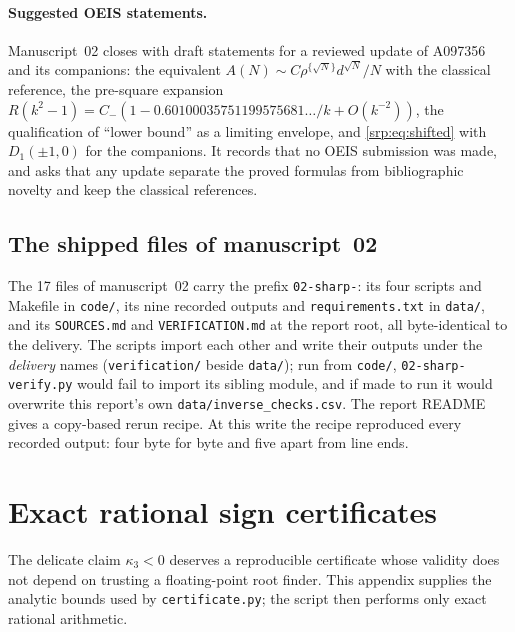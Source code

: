 \documentclass[11pt,a4paper]{article}
\numberwithin{equation}{section}
\theoremstyle{definition}
\theoremstyle{remark}
\begin{document}
\paragraph{Suggested OEIS statements.} Manuscript~02 closes with draft
statements for a reviewed update of A097356 and its companions: the
equivalent $A(N)\sim C\rho^{\{\sqrt N\}}d^{\sqrt N}/N$ with the classical
reference, the pre-square expansion
$R(k^2-1)=C_-(1-0.60100035751199575681\ldots/k+O(k^{-2}))$, the
qualification of ``lower bound'' as a limiting envelope, and
\eqref{srp:eq:shifted} with $D_1(\pm1,0)$ for the companions. It records
that no OEIS submission was made, and asks that any update separate the
proved formulas from bibliographic novelty and keep the classical
references.

\subsection{The shipped files of manuscript~02}
\label{srp:se:sec:files}

The 17 files of manuscript~02 carry the prefix \texttt{02-sharp-}: its four
scripts and Makefile in \texttt{code/}, its nine recorded outputs and
\texttt{requirements.txt} in \texttt{data/}, and its \texttt{SOURCES.md}
and \texttt{VERIFICATION.md} at the report root, all byte-identical to the
delivery. The scripts import each other and write their outputs under the
\emph{delivery} names (\texttt{verification/} beside \texttt{data/}); run
from \texttt{code/}, \texttt{02-sharp-verify.py} would fail to import its
sibling module, and if made to run it would overwrite this report's own
\texttt{data/inverse\_checks.csv}. The report README gives a copy-based
rerun recipe. At this write the recipe reproduced every recorded output:
four byte for byte and five apart from line ends.

\setcounter{table}{\value{srpsavedtable}}
\renewcommand{\thetable}{\arabic{table}}
\renewcommand{\theHtable}{\arabic{table}}

\appendix
{}%
\section{Exact rational sign certificates}
\label{srp:sec:certificate}

The delicate claim $\kappa_3<0$ deserves a reproducible certificate whose
validity does not depend on trusting a floating-point root finder.
This appendix supplies the analytic bounds used by
\texttt{certificate.py}; the script then performs only exact rational
arithmetic.
\end{document}

